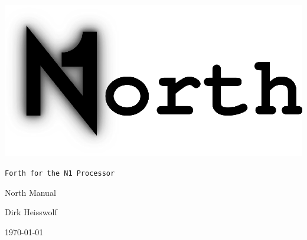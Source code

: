\documentclass[a4paper,
               titlepage,
               bibliography=totocnumbered]{article}
\begin{document}
\makeatletter
\newcommand*{\textoverline}[1]{$\overline{\hbox{#1}}\m@th$}
\makeatother

\makeatletter
\renewcommand{\thetable}{\thesection-\@arabic\c@table}
\makeatother

\makeatletter
\renewcommand{\thefigure}{\thesection-\@arabic\c@figure}
\makeatother

\setcounter{secnumdepth}{4}

\newcommand{\secref}[2][Section]{\hyperref[{#2}]{\mbox{#1~\ref*{#2}} \mbox{``\nameref*{#2}``}}}
\newcommand{\tabref}[2][Table]{\hyperref[{#2}]{\mbox{#1~\ref*{#2}}}}
\newcommand{\figref}[2][Figure]{\hyperref[{#2}]{\mbox{#1~\ref*{#2}}}}
\renewcommand{\footref}[1]{\textsuperscript{\ref{#1}}}

\lstset{
  basicstyle=\ttfamily,
  columns=fullflexible,
}


\begin{titlepage}
  \centering
  \includegraphics[width=1\textwidth]{./North_logo.eps} \par
  \vspace{-1cm}
  \Large \texttt{Forth for the N1 Processor} \par
  \vspace{2cm}
  \LARGE North Manual \par
  \vspace{1cm}
  \Large Dirk Heisswolf \par
  \vspace{0.5cm}
  \large \today \par
\end{titlepage}
\end{document}
